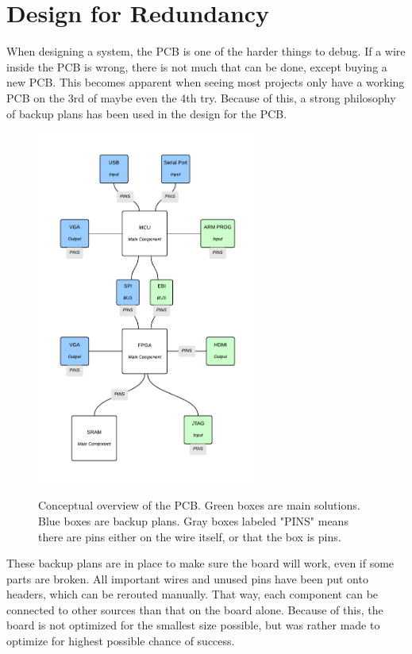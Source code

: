 \documentclass[../main/report.tex]{subfiles}
\begin{document}
\section{Design for Redundancy}

When designing a system, the PCB is one of the harder things to debug.
If a wire inside the PCB is wrong, there is not much that can be done, except buying a new PCB.
This becomes apparent when seeing most projects only have a working PCB on the 3rd of maybe even the 4th try. 
Because of this, a strong philosophy of backup plans has been used in the design for the PCB.

\begin{figure}[H]
    \centering
    \includegraphics[width=0.65\textwidth]{../pcb/assets/pcb-overview.pdf}
    \label{fig:pcb-overview}
    \caption{Conceptual overview of the PCB. Green boxes are main solutions. Blue boxes are backup plans.
             Gray boxes labeled "PINS" means there are pins either on the wire itself, or that the box is pins.}
\end{figure}

These backup plans are in place to make sure the board will work, even if some parts are broken.
All important wires and unused pins have been put onto headers, which can be rerouted manually.
That way, each component can be connected to other sources than that on the board alone.
Because of this, the board is not optimized for the smallest size possible, but was rather made to optimize for highest possible chance of success.
\end{document}
